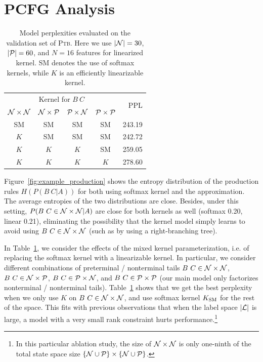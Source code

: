 \documentclass{article}
\begin{document}
\section{PCFG Analysis}
\begin{table}[!htp]
\centering
\begin{tabular}{@{}ccccr@{}}
\toprule
\multicolumn{4}{c}{Kernel for $B\ C $} & \multirow{2}{*}{PPL}\\
\cmidrule{1-4}
$\mathcal{N}\times \mathcal{N}$ & $\mathcal{N}\times\mathcal{P}$  & $\mathcal{P}\times\mathcal{N}$ & $\mathcal{P}\times\mathcal{P}$ \\
\midrule
  SM & SM & SM & SM & 243.19\\
  $K$ & SM & SM & SM & 242.72\\
  $K$ & $K$ & $K$ & SM &  259.05 \\
  $K$ & $K$ & $K$ & $K$ & 278.60 \\
\bottomrule
\end{tabular}
\caption{\label{tbl:cky-ablation}Model perplexities evaluated on the validation set of \textsc{Ptb}. Here we use $|\mathcal{N}|=30$, $|\mathcal{P}|=60$, and $N=16$ features for linearized kernel. SM denotes the use of softmax kernels, while $K$ is an efficiently linearizable kernel.}
\end{table}

Figure~\ref{fig:example_production} shows the entropy distribution of the production rules $H(P(B\ C | A))$ for both using softmax kernel and the approximation. The average entropies of the two distributions are close. Besides, under this setting, $P(B\ C \in \mathcal{N} \times \mathcal{N}| A)$ are close for both kernels as well (softmax 0.20, linear 0.21), eliminating the possibility that the kernel model simply learns to avoid using $B\ C \in \mathcal{N} \times \mathcal{N}$ (such as by using a right-branching tree).

In Table~\ref{tbl:cky-ablation}, we consider the effects of the mixed kernel parameterization, i.e. of replacing the softmax kernel with a linearizable kernel. In particular, we consider different combinations of preterminal / nonterminal tails $B\ C\in \mathcal{N}\times\mathcal{N}$, $B\ C\in \mathcal{N}\times\mathcal{P}$, $B\ C\in \mathcal{P}\times\mathcal{N}$, and $B\ C\in \mathcal{P}\times\mathcal{P}$ (our main model only factorizes nonterminal / nonterminal tails). Table~\ref{tbl:cky-ablation} shows that we get the best perplexity when we only use $K$ on $B\ C\in \mathcal{N}\times\mathcal{N}$, and use softmax kernel $K_{\mathrm{SM}}$ for the rest of the space. This fits with previous observations that when the label space $|\mathcal{L}|$ is large, a model with a very small rank constraint hurts performance.\footnote{In this particular ablation study, the size of $\mathcal{N}\times\mathcal{N}$ is only one-ninth of the total state space size $\{\mathcal{N} \cup \mathcal{P}\}\times \{\mathcal{N} \cup \mathcal{P}\}$.}
\end{document}
